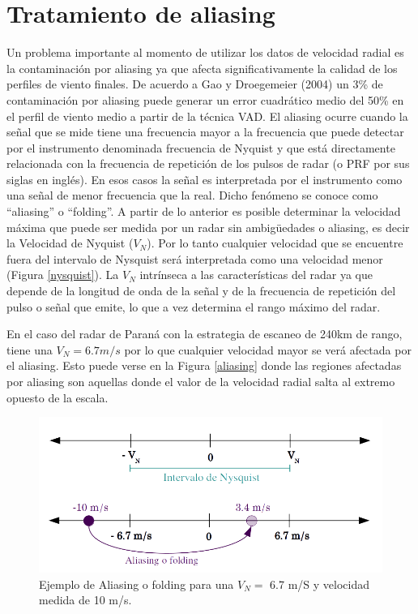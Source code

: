 \documentclass[12pt,spanish,oneside, a4paper]{book}
\begin{document}
\section{\texorpdfstring{Tratamiento de aliasing
\label{sec-aliasing}}{Tratamiento de aliasing }}\label{tratamiento-de-aliasing}

Un problema importante al momento de utilizar los datos de velocidad
radial es la contaminación por aliasing ya que afecta significativamente
la calidad de los perfiles de viento finales. De acuerdo a Gao y
Droegemeier (2004) un 3\% de contaminación por aliasing puede generar un
error cuadrático medio del 50\% en el perfil de viento medio a partir de
la técnica VAD. El aliasing ocurre cuando la señal que se mide tiene una
frecuencia mayor a la frecuencia que puede detectar por el instrumento
denominada frecuencia de Nyquist y que está directamente relacionada con
la frecuencia de repetición de los pulsos de radar (o PRF por sus siglas
en inglés). En esos casos la señal es interpretada por el instrumento
como una señal de menor frecuencia que la real. Dicho fenómeno se conoce
como ``aliasing'' o ``folding''. A partir de lo anterior es posible
determinar la velocidad máxima que puede ser medida por un radar sin
ambigüedades o aliasing, es decir la Velocidad de Nyquist (\(V_N\)). Por
lo tanto cualquier velocidad que se encuentre fuera del intervalo de
Nysquist será interpretada como una velocidad menor (Figura
\ref{nysquist}). La \(V_N\) intrínseca a las características del radar
ya que depende de la longitud de onda de la señal y de la frecuencia de
repetición del pulso o señal que emite, lo que a vez determina el rango
máximo del radar.

En el caso del radar de Paraná con la estrategia de escaneo de 240km de
rango, tiene una \(V_N = 6.7 m/s\) por lo que cualquier velocidad mayor
se verá afectada por el aliasing. Esto puede verse en la Figura
\ref{aliasing} donde las regiones afectadas por aliasing son aquellas
donde el valor de la velocidad radial salta al extremo opuesto de la
escala.

\begin{figure}

{\centering \includegraphics{seudocache/Figura_aliasing} 

}

\caption{Ejemplo de Aliasing o folding para una $V_N =$ 6.7 m/S y velocidad medida de 10 m/s. \label{nysquist}}\label{fig:nysquist}
\end{figure}
\end{document}
